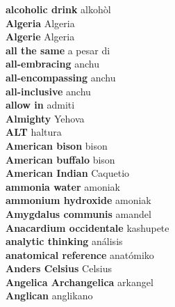 \textbf{ alcoholic drink  } alkohòl \\
\textbf{ Algeria  } Algeria \\
\textbf{ Algerie  } Algeria \\
\textbf{ all the same  } a pesar di \\
\textbf{ all-embracing  } anchu \\
\textbf{ all-encompassing  } anchu \\
\textbf{ all-inclusive  } anchu \\
\textbf{ allow in  } admiti \\
\textbf{ Almighty  } Yehova \\
\textbf{ ALT  } haltura \\
\textbf{ American bison  } bison \\
\textbf{ American buffalo  } bison \\
\textbf{ American Indian  } Caquetio \\
\textbf{ ammonia water  } amoniak \\
\textbf{ ammonium hydroxide  } amoniak \\
\textbf{ Amygdalus communis  } amandel \\
\textbf{ Anacardium occidentale  } kashupete \\
\textbf{ analytic thinking  } análisis \\
\textbf{ anatomical reference  } anatómiko \\
\textbf{ Anders Celsius  } Celsius \\
\textbf{ Angelica Archangelica  } arkangel \\
\textbf{ Anglican  } anglikano \\
